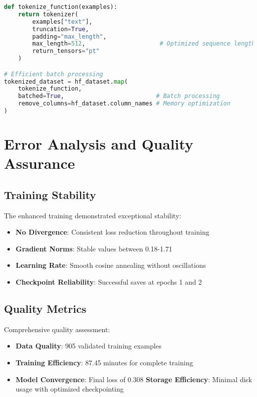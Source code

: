 \documentclass[12pt,a4paper]{article}
\begin{document}
\begin{lstlisting}[language=Python, caption=Dataset Tokenization]
def tokenize_function(examples):
    return tokenizer(
        examples["text"],
        truncation=True,
        padding="max_length",
        max_length=512,                     # Optimized sequence length
        return_tensors="pt"
    )

# Efficient batch processing
tokenized_dataset = hf_dataset.map(
    tokenize_function,
    batched=True,                          # Batch processing
    remove_columns=hf_dataset.column_names # Memory optimization
)
\end{lstlisting}

\section{Error Analysis and Quality Assurance}

\subsection{Training Stability}
The enhanced training demonstrated exceptional stability:

\begin{itemize}
    \item \textbf{No Divergence}: Consistent loss reduction throughout training
    \item \textbf{Gradient Norms}: Stable values between 0.18-1.71
    \item \textbf{Learning Rate}: Smooth cosine annealing without oscillations
    \item \textbf{Checkpoint Reliability}: Successful saves at epochs 1 and 2
\end{itemize}

\subsection{Quality Metrics}
Comprehensive quality assessment:

\begin{itemize}
    \item \textbf{Data Quality}: 905 validated training examples
    \item \textbf{Training Efficiency}: 87.45 minutes for complete training
    \item \textbf{Model Convergence}: Final loss of 0.308
    \textbf{Storage Efficiency}: Minimal disk usage with optimized checkpointing
\end{itemize}
\end{document}
